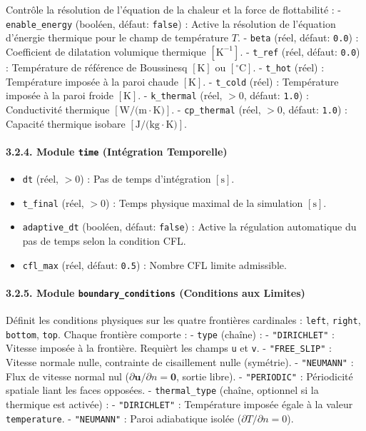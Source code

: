 \documentclass[
  french,
]{article}
\providecommand{\tightlist}{%
  \setlength{\itemsep}{0pt}\setlength{\parskip}{0pt}}
\begin{document}
Contrôle la résolution de l'équation de la chaleur et la force de
flottabilité : - \texttt{enable\_energy} (booléen, défaut:
\texttt{false}) : Active la résolution de l'équation d'énergie thermique
pour le champ de température \(T\). - \texttt{beta} (réel, défaut:
\texttt{0.0}) : Coefficient de dilatation volumique thermique
\([\text{K}^{-1}]\). - \texttt{t\_ref} (réel, défaut: \texttt{0.0}) :
Température de référence de Boussinesq \([\text{K}]\) ou
\([^{\circ}\text{C}]\). - \texttt{t\_hot} (réel) : Température imposée à
la paroi chaude \([\text{K}]\). - \texttt{t\_cold} (réel) : Température
imposée à la paroi froide \([\text{K}]\). - \texttt{k\_thermal} (réel,
\(>0\), défaut: \texttt{1.0}) : Conductivité thermique
\([\text{W/(m}\cdot\text{K)}]\). - \texttt{cp\_thermal} (réel, \(>0\),
défaut: \texttt{1.0}) : Capacité thermique isobare
\([\text{J/(kg}\cdot\text{K)}]\).

\paragraph{\texorpdfstring{3.2.4. Module \texttt{time} (Intégration
Temporelle)}{3.2.4. Module time (Intégration Temporelle)}}\label{module-time-intuxe9gration-temporelle}

\begin{itemize}
\tightlist
\item
  \texttt{dt} (réel, \(>0\)) : Pas de temps d'intégration
  \([\text{s}]\).
\item
  \texttt{t\_final} (réel, \(>0\)) : Temps physique maximal de la
  simulation \([\text{s}]\).
\item
  \texttt{adaptive\_dt} (booléen, défaut: \texttt{false}) : Active la
  régulation automatique du pas de temps selon la condition CFL.
\item
  \texttt{cfl\_max} (réel, défaut: \texttt{0.5}) : Nombre CFL limite
  admissible.
\end{itemize}

\paragraph{\texorpdfstring{3.2.5. Module \texttt{boundary\_conditions}
(Conditions aux
Limites)}{3.2.5. Module boundary\_conditions (Conditions aux Limites)}}\label{module-boundary_conditions-conditions-aux-limites}

Définit les conditions physiques sur les quatre frontières cardinales :
\texttt{left}, \texttt{right}, \texttt{bottom}, \texttt{top}. Chaque
frontière comporte : - \texttt{type} (chaîne) : - \texttt{"DIRICHLET"} :
Vitesse imposée à la frontière. Requièrt les champs \texttt{u} et
\texttt{v}. - \texttt{"FREE\_SLIP"} : Vitesse normale nulle, contrainte
de cisaillement nulle (symétrie). - \texttt{"NEUMANN"} : Flux de vitesse
normal nul (\(\partial \mathbf{u} / \partial n = \mathbf{0}\), sortie
libre). - \texttt{"PERIODIC"} : Périodicité spatiale liant les faces
opposées. - \texttt{thermal\_type} (chaîne, optionnel si la thermique
est activée) : - \texttt{"DIRICHLET"} : Température imposée égale à la
valeur \texttt{temperature}. - \texttt{"NEUMANN"} : Paroi adiabatique
isolée (\(\partial T / \partial n = 0\)).
\end{document}
